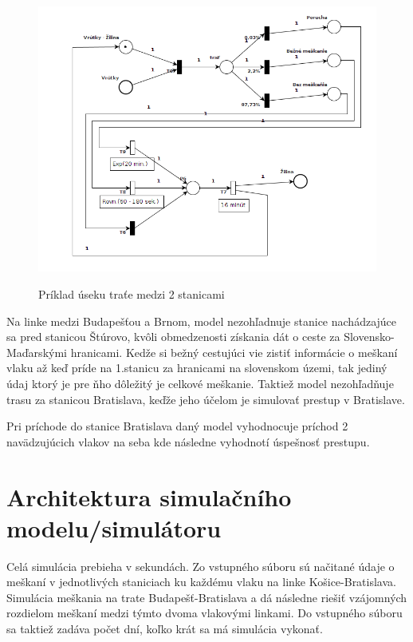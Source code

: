 \documentclass[11pt,a4paper]{article}
\begin{document}
\begin{figure}[H]
    \begin{center}
    \scalebox{0.65}
    {
        \includegraphics{Petri_net_3.png}
    }
    \caption{Príklad úseku traťe medzi 2 stanicami}
    \label{pic:PETSIET3}
    \end{center}
\end{figure}

Na linke medzi Budapešťou a Brnom, model nezohľadnuje stanice nachádzajúce sa pred stanicou Štúrovo, kvôli obmedzenosti získania dát o ceste za Slovensko-Maďarskými hranicami.
Kedže si bežný cestujúci vie zistiť informácie o meškaní vlaku až keď príde na 1.stanicu za hranicami na slovenskom územi, tak jediný údaj ktorý je pre ňho dôležitý je celkové meškanie.
Taktiež model nezohľadňuje trasu za stanicou Bratislava, keďže jeho účelom je simulovať prestup v Bratislave.

Pri príchode do stanice Bratislava daný model vyhodnocuje príchod 2 navädzujúcich vlakov na seba kde následne vyhodnotí úspešnosť prestupu.

\section{Architektura simulačního modelu/simulátoru}
\label{sec:ARCHITEKTURA}

Celá simulácia prebieha v sekundách.
Zo vstupného súboru sú načitané údaje o meškaní v jednotlivých staniciach ku každému vlaku na linke Košice-Bratislava.
Simulácia meškania na trate Budapešť-Bratislava a dá následne riešiť vzájomných rozdielom meškaní medzi týmto dvoma vlakovými linkami.
Do vstupného súboru sa taktiež zadáva počet dní, koľko krát sa má simulácia vykonať.
\end{document}
